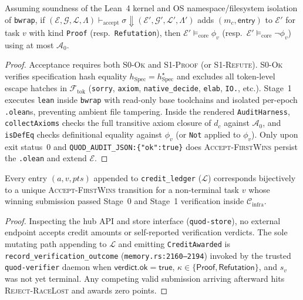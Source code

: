 \documentclass[sigplan,nonacm,10pt]{acmart}
\newcommand{\Cinfra}{\mathcal{C}_{\mathrm{infra}}}
\newcommand{\Truth}{\mathcal{E}}
\newcommand{\Orch}{\mathcal{G}}
\newcommand{\Ledger}{\mathcal{L}}
\newcommand{\Events}{\Lambda}
\newcommand{\Spec}{\mathrm{Spec}}
\newcommand{\AxiomsZero}{\mathcal{A}_0}
\newcommand{\judge}[3]{#1 \vdash_{\mathrm{accept}} #2 \Downarrow #3}
\newcommand{\kw}[1]{\mathsf{#1}}
\newcommand{\code}[1]{\texttt{#1}}
\begin{document}
\begin{theorem}\label{thm:kernel-soundness}
Assuming soundness of the Lean~4 kernel and OS namespace/filesystem isolation of \code{bwrap}, if $\judge{(\Truth,\Orch,\Ledger,\Events)}{\sigma}{(\Truth',\Orch',\Ledger',\Events')}$ adds $(m_c, \kw{entry})$ to $\Truth'$ for task $v$ with kind \code{Proof} (resp.\ \code{Refutation}), then $\Truth' \models_{\mathrm{core}} \phi_v$ (resp.\ $\Truth' \models_{\mathrm{core}} \neg\phi_v$) using at most $\AxiomsZero$.
\end{theorem}

\begin{proof}
Acceptance requires both \textsc{S0-Ok} and \textsc{S1-Proof} (or \textsc{S1-Refute}). \textsc{S0-Ok} verifies specification hash equality $h_{\Spec} = h_{\Spec}^{\star}$ and excludes all token-level escape hatches in $\mathcal{F}_{\mathrm{tok}}$ (\code{sorry}, \code{axiom}, \code{native\_decide}, \code{elab}, \code{IO.}, etc.). Stage~1 executes \code{lean} inside \code{bwrap} with read-only base toolchains and isolated per-epoch \code{.olean}s, preventing ambient file tampering. Inside the rendered \code{AuditHarness}, \code{collectAxioms} checks the full transitive axiom closure of $d_c$ against $\AxiomsZero$, and \code{isDefEq} checks definitional equality against $\phi_v$ (or \code{Not} applied to $\phi_v$). Only upon exit status~0 and \code{QUOD\_AUDIT\_JSON:\{"ok":true\}} does \textsc{Accept-FirstWins} persist the \code{.olean} and extend $\Truth$.
\end{proof}

\begin{theorem}\label{thm:credit-integrity}
Every entry $(a, v, pts)$ appended to \code{credit\_ledger} ($\Ledger$) corresponds bijectively to a unique \textsc{Accept-FirstWins} transition for a non-terminal task $v$ whose winning submission passed Stage~0 and Stage~1 verification inside $\Cinfra$.
\end{theorem}

\begin{proof}
Inspecting the hub API and store interface (\code{quod-store}), no external endpoint accepts credit amounts or self-reported verification verdicts. The sole mutating path appending to $\Ledger$ and emitting \code{CreditAwarded} is \code{record\_\-verification\_\-outcome} (\code{memory.rs:2160--2194}) invoked by the trusted \code{quod-verifier} daemon when $\kw{verdict.ok} = \kw{true}$, $\kappa \in \{\kw{Proof}, \kw{Refutation}\}$, and $s_v$ was not yet terminal. Any competing valid submission arriving afterward hits \textsc{Reject-RaceLost} and awards zero points.
\end{proof}
\end{document}
